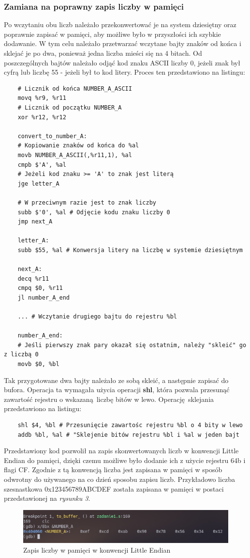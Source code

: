 \documentclass[a4paper,12pt]{article}
\begin{document}
\subsubsection{Zamiana na poprawny zapis liczby w pamięci}
Po wczytaniu obu liczb należało przekonwertować je na system dziesiętny oraz poprawnie zapisać w pamięci, aby możliwe było w przyszłości ich szybkie dodawanie. W tym celu należało przetwarzać wczytane bajty znaków od końca i sklejać je po dwa, ponieważ jedna liczba mieści się na 4 bitach. Od poszczególnych bajtów należało odjąć kod znaku ASCII liczby 0, jeżeli znak był cyfrą lub liczbę 55 - jeżeli był to kod litery. Proces ten przedstawiono na listingu:
\begin{verbatim}
	# Licznik od końca NUMBER_A_ASCII
	movq %r9, %r11
	# Licznik od początku NUMBER_A
	xor %r12, %r12
	
	convert_to_number_A:
	# Kopiowanie znaków od końca do %al
	movb NUMBER_A_ASCII(,%r11,1), %al
	cmpb $'A', %al
	# Jeżeli kod znaku >= 'A' to znak jest literą
	jge letter_A
	
	# W przeciwnym razie jest to znak liczby
	subb $'0', %al # Odjęcie kodu znaku liczby 0
	jmp next_A
	
	letter_A:
	subb $55, %al # Konwersja litery na liczbę w systemie dziesiętnym
	
	next_A:
	decq %r11
	cmpq $0, %r11
	jl number_A_end
	
	... # Wczytanie drugiego bajtu do rejestru %bl
	
	number_A_end:
	# Jeśli pierwszy znak pary okazał się ostatnim, należy "skleić" go z liczbą 0
	movb $0, %bl
\end{verbatim}
Tak przygotowane dwa bajty należało ze sobą skleić, a następnie zapisać do bufora. Operacja ta wymagała użycia operacji \textbf{shl}, która pozwala przesunąć zawartość rejestru o wskazaną liczbę bitów w lewo. Operację sklejania przedstawiono na listingu:
\begin{verbatim}
	shl $4, %bl # Przesunięcie zawartośc rejestru %bl o 4 bity w lewo
	addb %bl, %al # "Sklejenie bitów rejestru %bl i %al w jeden bajt
\end{verbatim} 
Przedstawiony kod pozwolił na zapis skonwertowanych liczb w konwencji Little Endian do pamięci, dzięki czemu możliwe było dodanie ich z użycie rejestru 64b i flagi CF. Zgodnie z tą konwencją liczba jest zapisana w pamięci w sposób odwrotny do używanego na co dzień sposobu zapisu liczb. Przykładowo liczba szesnastkowa 0x123456789ABCDEF została zapisana w pamięci w postaci przedstawionej na \textit{rysunku 3}.
\begin{center}
	\begin{figure}[h]
		\centering\includegraphics[width=17cm]{Materialy/Lab2/LE}
		\caption{Zapis liczby w pamięci w konwencji Little Endian}
		\label{LE}
	\end{figure}
\end{center}
\end{document}
